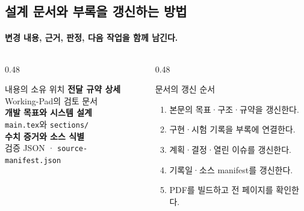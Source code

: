 \subsection{설계 문서와 부록을 갱신하는 방법}\label{record-management}
\begingroup%
  \framesubtitle{변경 내용, 근거, 판정, 다음 작업을 함께 남긴다.}
  \begin{columns}[T,onlytextwidth]
    \begin{column}{0.48\textwidth}
      \begin{block}{내용의 소유 위치}
        \textbf{전달 규약 상세}\\
        Working-Pad의 검토 문서\\[0.7em]
        \textbf{개발 목표와 시스템 설계}\\
        \texttt{main.tex}와 \texttt{sections/}\\[0.7em]
        \textbf{수치 증거와 소스 식별}\\
        검증 JSON · \texttt{source-manifest.json}
      \end{block}
    \end{column}
    \begin{column}{0.48\textwidth}
      \begin{block}{문서의 갱신 순서}
        \begin{enumerate}
          \item 본문의 목표·구조·규약을 갱신한다.
          \item 구현·시험 기록을 부록에 연결한다.
          \item 계획·결정·열린 이슈를 갱신한다.
          \item 기록일·소스 manifest를 갱신한다.
          \item PDF를 빌드하고 전 페이지를 확인한다.
        \end{enumerate}
      \end{block}
    \end{column}
  \end{columns}
  \medskip
\endgroup


